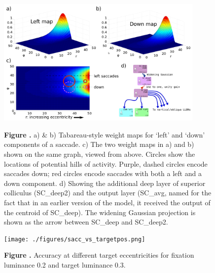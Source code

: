 \documentclass{frontiersSCNS}
\begin{document}
\begin{figure}[htb!]
\begin{center}
\includegraphics[width=0.9\textwidth]{./figures/scdeep_plus.png}
\end{center}
\textbf{\label{scdeep} Figure .}
{ a) \& b) Tabareau-style weight maps for `left' and `down' components
of a saccade. c) The two weight maps in a) and b) shown on the same
graph, viewed from above. Circles show the locations of potential
hills of activity. Purple, dashed circles encode saccades down;
red circles encode saccades with both a left and a down component. d)
Showing the additional deep layer of superior colliculus (SC\_deep2)
and the output layer (SC\_avg, named for the fact that in an earlier
version of the model, it received the output of the centroid of
SC\_deep).  The widening Gaussian projection is shown as the arrow
between SC\_deep and SC\_deep2.}
\end{figure}

\begin{figure}[htb!]
\begin{center}
\texttt{[image: ./figures/sacc\_vs\_targetpos.png]}
\end{center}
\textbf{\label{sacc_vs_targ} Figure .}
{ Accuracy at different target eccentricities for fixation luminance
0.2 and target luminance 0.3.}
\end{figure}
\end{document}
